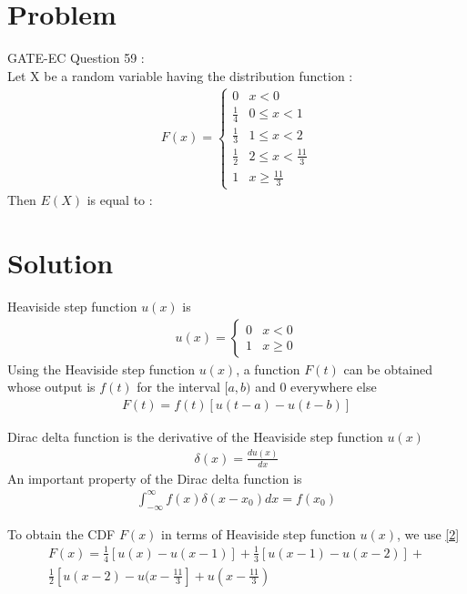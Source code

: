 \documentclass[journal,12pt,twocolumn]{IEEEtran}
\begin{document}
\section*{\textbf{Problem}}
GATE-EC Question 59 : \\
Let X be a random variable having the distribution function :
\begin{align*}
F(x)=   
\begin{cases}
0 & x<0 \\
\frac{1}{4} & 0\le x<1 \\
\frac{1}{3} & 1\le x<2 \\
\frac{1}{2} & 2\le x<\frac{11}{3} \\
1 & x\ge\frac{11}{3}
\end{cases}
\end{align*}
Then $E(X)$ is equal to :
\section*{\textbf{Solution}}
\begin{definition}
Heaviside step function $u(x)$ is 
\begin{align*}
u(x)=               \tag{1} \label{1}
    \begin{cases}
    0 & x<0 \\
    1 & x\geq 0
    \end{cases}
\end{align*}
Using the Heaviside step function $u(x)$, a function $F(t)$ can be obtained whose output is $f(t)$ for the interval $[a,b)$ and $0$ everywhere else
\begin{align*}
    F(t)=f(t)[u(t-a) - u(t-b)] \tag{2} \label{2}
\end{align*}
\end{definition}
\begin{definition}
Dirac delta function is the derivative of the Heaviside step function $u(x)$
\begin{align*}
    \delta(x) = \frac{du(x)}{dx} \tag{3} \label{3}
\end{align*}
An important property of the Dirac delta function is 
\begin{align*}
    \int_{-\infty}^{\infty}f(x)\delta(x-x_0)dx = f(x_0) \tag{4} \label{4}
\end{align*}
\end{definition}
\textrightarrow To obtain the CDF $F(x)$ in terms of Heaviside step function $u(x)$, we use \eqref{2}
\begin{multline*}
F(x)=\frac{1}{4}[u(x)-u(x-1)]+\frac{1}{3}[u(x-1)-u(x-2)]+\\
\frac{1}{2}[u(x-2)-u(x-\frac{11}{3}]+u(x-\frac{11}{3})
\end{multline*}
\end{document}
